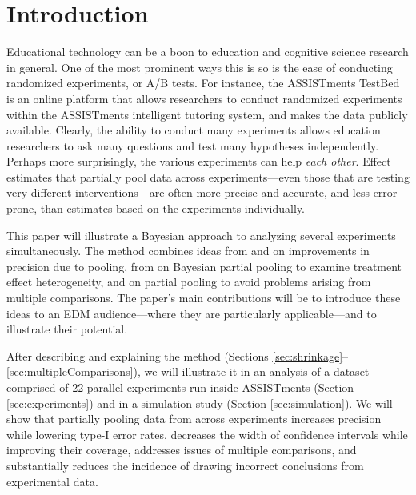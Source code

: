 \documentclass{edm_template}
\begin{document}
\section{Introduction}
Educational technology can be a boon to education and cognitive science research in general.
One of the most prominent ways this is so is the ease of conducting randomized experiments, or A/B tests.
For instance, the ASSISTments TestBed \cite{testbed} is an online platform that allows researchers to conduct randomized experiments within the ASSISTments intelligent tutoring system, and makes the data publicly available. 
Clearly, the ability to conduct many experiments allows education researchers to ask many questions and test many hypotheses independently.
Perhaps more surprisingly, the various experiments can help \emph{each other}.
Effect estimates that partially pool data across experiments---even those that are testing very different interventions---are often more precise and accurate, and less error-prone, than estimates based on the experiments individually. 

This paper will illustrate a Bayesian approach to analyzing several experiments simultaneously.
The method combines ideas from \cite{jamesStein} and \cite{efronMorris} on improvements in precision due to pooling, from \cite{rubin} on Bayesian partial pooling to examine treatment effect heterogeneity, and \cite{gelmanMultiple} on partial pooling to avoid problems arising from multiple comparisons. 
The paper's main contributions will be to introduce these ideas to an EDM audience---where they are particularly applicable---and to illustrate their potential.

After describing and explaining the method (Sections \ref{sec:shrinkage}--\ref{sec:multipleComparisons}), we will illustrate it in an analysis of a dataset comprised of 22 parallel experiments run inside ASSISTments \cite{data} (Section \ref{sec:experiments}) and in a simulation study (Section \ref{sec:simulation}). We will show that partially pooling data from across experiments increases precision while lowering type-I error rates, decreases the width of confidence intervals while improving their coverage, addresses issues of multiple comparisons, and substantially reduces the incidence of drawing incorrect conclusions from experimental data. 
\end{document}
